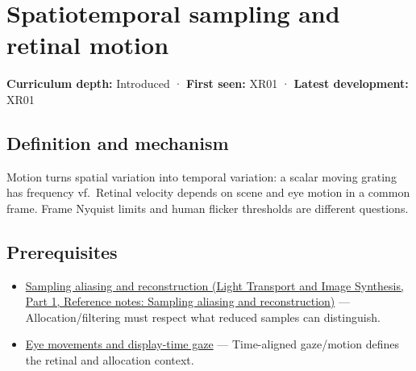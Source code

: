 \hypertarget{appendix-70895739febb}{}\label{referencestart:appendix-70895739febb}
\section{Spatiotemporal sampling and retinal motion}\label{appendix-70895739febb-spatiotemporal-sampling-and-retinal-motion}

\hypertarget{appendix-70895739febb-spatiotemporal-sampling-and-retinal-motion}{}

\textbf{Curriculum depth:} Introduced · \textbf{First seen:} XR01 · \textbf{Latest development:} XR01

\begin{allmightroledefinition}

\subsection{Definition and mechanism}\label{appendix-70895739febb-definition-and-mechanism}

\hypertarget{appendix-70895739febb-definition-and-mechanism}{}

Motion turns spatial variation into temporal variation: a scalar moving grating has frequency \textbar v\textbar f.~Retinal velocity depends on scene and eye motion in a common frame. Frame Nyquist limits and human flicker thresholds are different questions.

\end{allmightroledefinition}

\subsection{Prerequisites}\label{appendix-70895739febb-prerequisites}

\hypertarget{appendix-70895739febb-prerequisites}{}

\begin{itemize}
\tightlist
\item
  \href{../04-Light-Transport-and-Image-Synthesis-P01/main.pdf\#nameddest=appendix-6a7869dd79a6}{Sampling aliasing and reconstruction (Light Transport and Image Synthesis, Part 1, Reference notes: Sampling aliasing and reconstruction)} --- Allocation/filtering must respect what reduced samples can distinguish.
\item
  \hyperref[appendix-a6f2c4fe1996]{Eye movements and display-time gaze} --- Time-aligned gaze/motion defines the retinal and allocation context.
\end{itemize}

